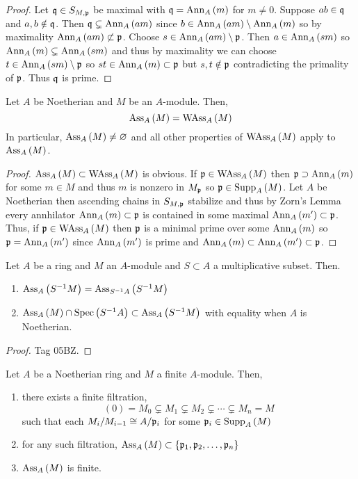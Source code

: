 \documentclass[12pt]{article}
\begin{document}
\begin{proof}
Let $\mathfrak{q} \in S_{M, \mathfrak{p}}$ be maximal with $\mathfrak{q} = \mathrm{Ann}_{A}\left(m\right)$ for $m \neq 0$. Suppose $ab \in \mathfrak{q}$ and $a, b \notin \mathfrak{q}$. Then $\mathfrak{q} \subsetneq \mathrm{Ann}_{A}\left(a m\right)$ since $b \in \mathrm{Ann}_{A}\left(a m\right) \setminus \mathrm{Ann}_{A}\left(m\right)$ so by maximality $\mathrm{Ann}_{A}\left(am\right) \not\subset \mathfrak{p}$. Choose $s \in \mathrm{Ann}_{A}\left(am\right) \setminus \mathfrak{p}$. Then $a \in \mathrm{Ann}_{A}\left(sm\right)$ so $\mathrm{Ann}_{A}\left(m\right) \subsetneq \mathrm{Ann}_{A}\left(sm\right)$ and thus by maximality we can choose $t \in \mathrm{Ann}_{A}\left(sm\right) \setminus \mathfrak{p}$ so $st \in \mathrm{Ann}_{A}\left(m\right) \subset \mathfrak{p}$ but $s,t \notin \mathfrak{p}$ contradicting the primality of $\mathfrak{p}$. Thus $\mathfrak{q}$ is prime. 
\end{proof}

\begin{prop}
Let $A$ be Noetherian and $M$ be an $A$-module. Then,
\[ \mathrm{Ass}_{A}\left( M \right) = \mathrm{WAss}_{A}\left(M \right)  \]
In particular, $\mathrm{Ass}_{A}\left( M \right) \neq \varnothing$ and all other properties of $\mathrm{WAss}_{A}\left(M \right)$ apply to $\mathrm{Ass}_{A}\left( M \right)$.
\end{prop}

\begin{proof}
$\mathrm{Ass}_{A}\left( M \right) \subset \mathrm{WAss}_{A}\left(M \right)$ is obvious. If $\mathfrak{p} \in \mathrm{WAss}_{A}\left(M \right)$ then $\mathfrak{p} \supset \mathrm{Ann}_{A}\left(m\right)$ for some $m \in M$ and thus $m$ is nonzero in $M_{\mathfrak{p}}$ so $\mathfrak{p} \in \mathrm{Supp}_{A}\left(M \right)$. Let $A$ be Noetherian then ascending chains in $S_{M, \mathfrak{p}}$ stabilize and thus by Zorn's Lemma every annhilator $\mathrm{Ann}_{A}\left(m\right) \subset \mathfrak{p}$ is contained in some maximal $\mathrm{Ann}_{A}\left(m'\right) \subset \mathfrak{p}$. Thus, if $\mathfrak{p} \in \mathrm{WAss}_{A}\left(M \right)$ then $\mathfrak{p}$ is a minimal prime over some $\mathrm{Ann}_{A}\left(m\right)$ so $\mathfrak{p} = \mathrm{Ann}_{A}\left(m'\right)$ since $\mathrm{Ann}_{A}\left(m'\right)$ is prime and $\mathrm{Ann}_{A}\left(m\right) \subset \mathrm{Ann}_{A}\left(m'\right) \subset \mathfrak{p}$.
\end{proof}


\begin{lemma} \label{ass_primes_localization}
Let $A$ be a ring and $M$ an $A$-module and $S \subset A$ a multiplicative subset. Then.
\begin{enumerate}
\item $\mathrm{Ass}_{A}\left( S^{-1} M \right) = \mathrm{Ass}_{S^{-1} A}\left( S^{-1} M \right)$ 
\item $\mathrm{Ass}_{A}\left( M \right) \cap \mathrm{Spec}\left( S^{-1} A \right) \subset \mathrm{Ass}_{A}\left( S^{-1} M \right)$ with equality when $A$ is Noetherian.
\end{enumerate}
\end{lemma}

\begin{proof}
Tag 05BZ.
\end{proof}


\begin{proposition} \label{noetherian_finite_wass}
Let $A$ be a Noetherian ring and $M$ a finite $A$-module. Then,
\begin{enumerate}
\item there exists a finite filtration,
\[ (0) = M_0 \subsetneq M_1 \subsetneq M_2 \subsetneq \cdots \subsetneq M_n = M \]
such that each $M_{i} / M_{i-1} \cong A / \mathfrak{p}_{i}$ for some $\mathfrak{p}_i \in \mathrm{Supp}_{A} \left( M \right)$
\item for any such filtration, $\mathrm{Ass}_{A}\left( M \right) \subset \{ \mathfrak{p}_1, \mathfrak{p}_2, \dots, \mathfrak{p}_n\}$
\item $\mathrm{Ass}_{A}\left( M \right)$ is finite.
\end{enumerate}
\end{proposition}
\end{document}
